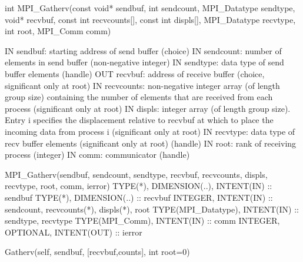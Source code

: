 int MPI_Gatherv(const void* sendbuf, int sendcount, MPI_Datatype sendtype,
  void* recvbuf, const int recvcounts[], const int displs[], MPI_Datatype recvtype,
  int root, MPI_Comm comm)

IN sendbuf: starting address of send buffer (choice)
IN sendcount: number of elements in send buffer (non-negative integer)
IN sendtype: data type of send buffer elements (handle)
OUT recvbuf: address of receive buffer (choice, significant only at root)
IN recvcounts: non-negative integer array (of length group size) containing the number of elements that are received from each process (significant only at root)
IN displs: integer array (of length group size). Entry i specifies the displacement relative to recvbuf at which to place the incoming data from process i (significant only at root)
IN recvtype: data type of recv buffer elements (significant only at root) (handle)
IN root: rank of receiving process (integer)
IN comm: communicator (handle)

MPI_Gatherv(sendbuf, sendcount, sendtype, recvbuf, recvcounts, displs, recvtype, root, comm, ierror)
TYPE(*), DIMENSION(..), INTENT(IN) :: sendbuf
TYPE(*), DIMENSION(..) :: recvbuf
INTEGER, INTENT(IN) :: sendcount, recvcounts(*), displs(*), root
TYPE(MPI_Datatype), INTENT(IN) :: sendtype, recvtype
TYPE(MPI_Comm), INTENT(IN) :: comm
INTEGER, OPTIONAL, INTENT(OUT) :: ierror


Gatherv(self, sendbuf, [recvbuf,counts], int root=0)
